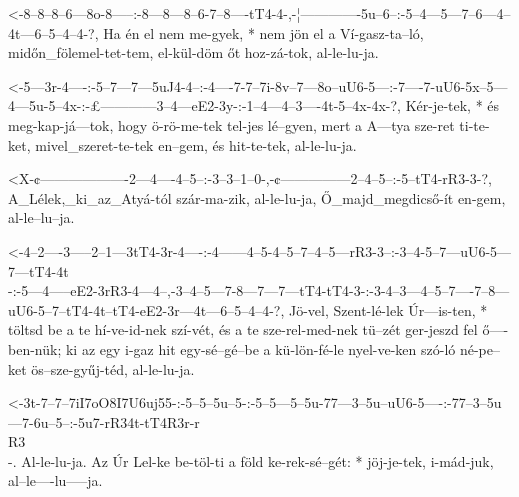 
  {<-8--8--8--6---8o-8-----:-8---8---8--6-7--8----tT4-4-,-¦-------------5u--6--:-5--4---5---7--6---4--4t---6--5--4--4-?,}
  {  Ha én el nem me-gyek, * nem jön el a Ví-gasz-ta--ló, midőn_fölemel-tet-tem, el-kül-döm őt hoz-zá-tok, al-le-lu-ja.}


  {<-5---3r-4----:-5--7---7---5uJ4-4--:-4----7-7--7i-8v--7---8o--uU6-5---:-7----7-uU6-5x--5---4---5u-5--4x-:-£------------3--4---eE2-3y-:-1--4---4--3----4t-5--4x-4x-?,}
  {  Kér-je-tek, * és meg-kap-já---tok, hogy ö-rö-me-tek tel-jes lé--gyen, mert a A---tya sze-ret ti-te-ket, mivel_szeret-te-tek en--gem, és hit-te-tek, al-le-lu-ja.}



  {<X-¢-------------------2---4----4--5--:-3--3--1--0-,-¢---------------2--4--5--:-5--tT4-rR3-3-?,}
  {   A_Lélek,_ki_az_Atyá-tól szár-ma-zik, al-le-lu-ja, Ő_majd_megdicső-ít en-gem, al-le--lu--ja.}

  {<-4--2----3-----2--1---3tT4-3r-4----:-4------4--5-4--5--7--4--5---rR3-3--:-3--4-5--7---uU6-5---7---tT4-4t\\-:-5---4-----eE2-3rR3-4---4--,-3--4--5---7-8---7---7---tT4-tT4-3-:-3-4--3---4--5--7----7--8---uU6-5--7--tT4-4t--tT4-eE2-3r---4t---6--5--4--4-?,}
  {  Jö-vel, Szent-lé-lek Úr---is-ten, * töltsd be a te hí-ve-id-nek szí-vét, és a te sze-rel-med-nek tü--zét    ger-jeszd fel ő----ben-nük; ki az egy i-gaz hit egy-sé--gé--be  a kü-lön-fé-le nyel-ve-ken szó-ló né-pe--ket ös--sze-gyűj-téd, al-le-lu-ja.}


  {<-3t-7--7--7iI7oO8I7U6uj55-:-5--5--5u--5-:-5--5---5--5u-77---3--5u--uU6-5----:-77--3--5u---7-6u--5--:-5u7-rR34t-tT4R3r-r\\R3\\-.}
  {  Al-le-lu-ja.               Az Úr Lel-ke  be-töl-ti a  föld ke-rek-sé--gét: * jöj-je-tek, i-mád-juk, al--le----lu-----ja.}


